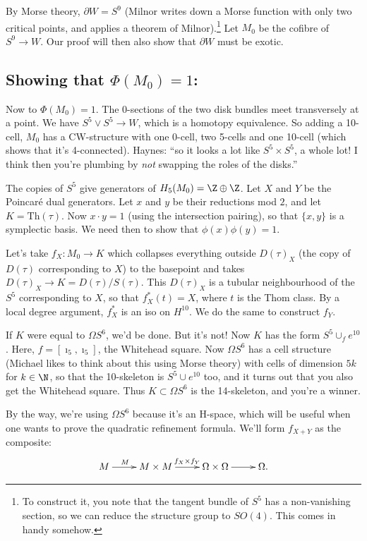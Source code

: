 \documentclass[11pt]{article}
\begin{document}
\begin{JandrKervaire}
By Morse theory, $\partial W=S^9$ (Milnor writes down a Morse function with only two critical points, and applies a theorem of Milnor).\footnote{To construct it, you note that the tangent bundle of $S^5$ has a non-vanishing section, so we can reduce the structure group to $SO(4)$. This comes in handy somehow.} 
Let $M_0$ be the cofibre of $S^9\to W$. Our proof will then also show that $\partial W$ must be exotic.

\subsection*{Showing that $\Phi(M_0)=1$:}
Now to $\Phi(M_0)=1$. The 0-sections of the two disk bundles meet transversely at a point. We have $S^5\vee S^5\to W$, which is a homotopy equivalence. So adding a 10-cell, $M_0$ has a CW-structure with one 0-cell, two 5-cells and one 10-cell (which shows that it's 4-connected). Haynes: ``so it looks a lot like $S^5\times S^5$, a whole lot! I think then you're plumbing by \emph{not} swapping the roles of the disks.''

The copies of $S^5$ give generators of $H_5(M_0)=\Z\oplus\Z$. Let $X$ and $Y$ be the Poincar\'e dual generators. Let $x$ and $y$ be their reductions mod $2$, and let $K=\text{Th}(\tau)$. Now $x\cdot y=1$ (using the intersection pairing), so that $\{x,y\}$ is a symplectic basis. We need then to show that $\phi(x)\phi(y)=1$.

Let's take $f_X:M_0\to K$ which collapses everything outside $D(\tau)_X$ (the copy of $D(\tau)$ corresponding to $X$) to the basepoint and takes $D(\tau)_X\to K=D(\tau)/S(\tau)$. This $D(\tau)_X$ is a tubular neighbourhood of the $S^5$ corresponding to $X$, so that $f_X^*(t)=X$, where $t$ is the Thom class. By a local degree argument, $f_X^*$ is an iso on $H^{10}$. We do the same to construct $f_Y$.

If $K$ were equal to $\Omega S^6$, we'd be done. But it's not! Now $K$ has the form $S^5\cup_f e^{10}$. Here, $f=[\imath_5,\imath_5]$, the Whitehead square. Now $\Omega S^6$ has a cell structure (Michael likes to think about this using Morse theory) with cells of dimension $5k$ for $k\in\N$, so that the 10-skeleton is $S^5\cup e^{10}$ too, and it turns out that you also get the Whitehead square. Thus $K\subset \Omega S^6$ is the 14-skeleton, and you're a winner. 

By the way, we're using $\Omega S^6$ because it's an H-space, which will be useful when one wants to prove the quadratic refinement formula. We'll form $f_{X+Y}$ as the composite:
\[\xymatrix{
M\ar[r]^{M\quad}&M\times M\ar[r]^{\ f_X\times f_Y}&\Omega\times\Omega\ar[r]&\Omega.
}\]

\end{JandrKervaire}
\end{document}
